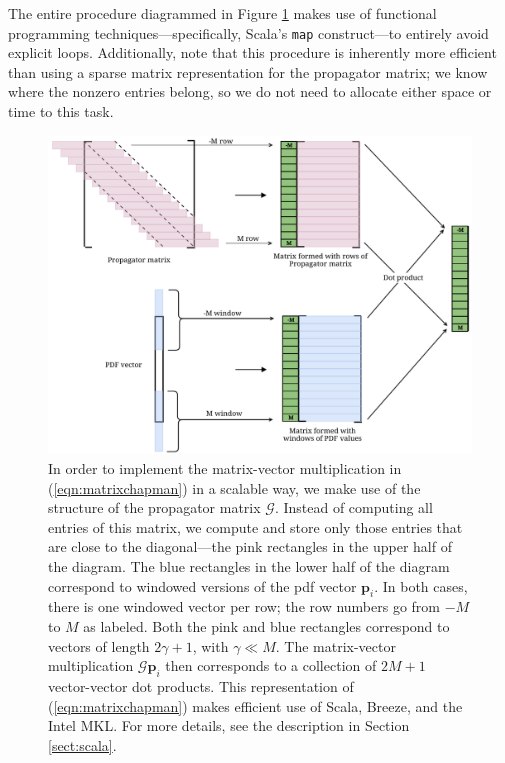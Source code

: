 \documentclass[wcp]{jmlr}
\begin{document}
The entire procedure diagrammed in Figure \ref{fig:implementation1}
makes use of functional programming techniques---specifically, Scala's
\texttt{map} construct---to entirely avoid explicit loops.
Additionally, note that this procedure is inherently more efficient
than using a sparse matrix representation for the propagator matrix;
we know where the nonzero entries belong, so we do not need to
allocate either space or time to this task.

\begin{figure}[ht]
\begin{center}
\includegraphics[width=6in]{gammawindow}
\end{center}
\caption{In order to implement the matrix-vector multiplication in
  (\ref{eqn:matrixchapman}) in a scalable way, we make use of the
  structure of the propagator matrix $\mathcal{G}$.  Instead of computing all
  entries of this matrix, we compute and store only those entries that
  are close to the diagonal---the pink rectangles in the upper half of
  the diagram.  The blue rectangles in the lower half of the diagram
  correspond to windowed versions of the pdf vector $\mathbf{p}_i$.
  In both cases, there is one windowed vector per row; the row numbers
  go from $-M$ to $M$ as labeled.  Both the pink and blue rectangles
  correspond to vectors of length  $2\gamma+1$, with $\gamma \ll M$.  The matrix-vector
  multiplication $\mathcal{G}  \mathbf{p}_i$ then corresponds to a
  collection of $2M+1$ vector-vector dot  products.  This
  representation of (\ref{eqn:matrixchapman}) makes efficient use of
  Scala, Breeze, and the Intel MKL.  For more details, see the description in Section \ref{sect:scala}.}
\label{fig:implementation1}
\end{figure}
\end{document}
